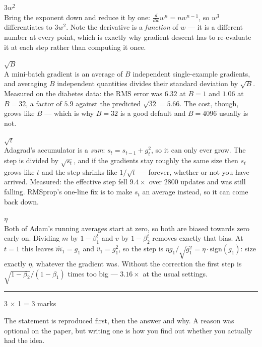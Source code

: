 \documentclass[10pt,a4paper]{article}
\newcommand{\parthead}[2]{\vspace{2pt}\noindent\rule{\linewidth}{0.4pt}\par\vspace{2pt}%
  \noindent{\bfseries Part #1}\hfill{\small #2}\par\vspace{1pt}}
\newcommand{\sol}[1]{\textbf{#1}}
\begin{document}
\begin{sB}

  \item \sol{$3w^2$}\\ Bring the exponent down and reduce it by one: $\frac{d}{dw}w^n = n w^{n-1}$, so $w^3$ differentiates to $3w^2$. Note the derivative is a \emph{function} of $w$ --- it is a different number at every point, which is exactly why gradient descent has to re-evaluate it at each step rather than computing it once.

  \item \sol{$\sqrt{B}$}\\ A mini-batch gradient is an average of $B$ independent single-example gradients, and averaging $B$ independent quantities divides their standard deviation by $\sqrt{B}$. Measured on the diabetes data: the RMS error was $6.32$ at $B=1$ and $1.06$ at $B=32$, a factor of $5.9$ against the predicted $\sqrt{32} = 5.66$. The cost, though, grows like $B$ --- which is why $B=32$ is a good default and $B=4096$ usually is not.

  \item \sol{$\sqrt{t}$}\\ Adagrad's accumulator is a \emph{sum}: $s_t = s_{t-1} + g_t^2$, so it can only ever grow. The step is divided by $\sqrt{s_t}$, and if the gradients stay roughly the same size then $s_t$ grows like $t$ and the step shrinks like $1/\sqrt{t}$ --- forever, whether or not you have arrived. Measured: the effective step fell $9.4\times$ over $2800$ updates and was still falling. RMSprop's one-line fix is to make $s_t$ an average instead, so it can come back down.

  \item \sol{$\eta$}\\ Both of Adam's running averages start at zero, so both are biased towards zero early on. Dividing $m$ by $1-\beta_1^t$ and $v$ by $1-\beta_2^t$ removes exactly that bias. At $t=1$ this leaves $\hat m_1 = g_1$ and $\hat v_1 = g_1^2$, so the step is $\eta g_1/\sqrt{g_1^2} = \eta \cdot \mathrm{sign}(g_1)$: size exactly $\eta$, whatever the gradient was. Without the correction the first step is $\sqrt{1-\beta_2}/(1-\beta_1)$ times too big --- $3.16\times$ at the usual settings.

\end{sB}

\newpage

\parthead{C --- True or false}{3 $\times$ 1 = 3 marks}

{\small The statement is reproduced first, then the answer and why. A reason was optional on the paper, but writing one is how you find out whether you actually had the idea.}
\end{document}
